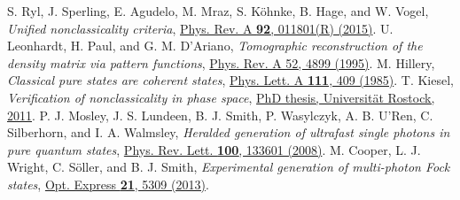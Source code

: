 \documentclass[aps,pra,twocolumn,showpacs,superscriptaddress,10pt]{revtex4-1}
\begin{document}
\begin{thebibliography}{100}
	 S. Ryl, J. Sperling, E. Agudelo, M. Mraz, S. K\"ohnke, B. Hage, and W. Vogel, {\it Unified nonclassicality criteria}, \href{http://link.aps.org/doi/10.1103/PhysRevA.92.011801}{Phys. Rev. A {\bf 92}, 011801(R) (2015)}.
	 U. Leonhardt, H. Paul, and G. M. D’Ariano, {\it Tomographic reconstruction of the density matrix via pattern functions}, \href{http://link.aps.org/doi/10.1103/PhysRevA.52.4899}{Phys. Rev. A 52, 4899 (1995)}.
	 M. Hillery, {\it Classical pure states are coherent states}, \href{http://www.sciencedirect.com/science/article/pii/0375960185904839}{Phys. Lett. A {\bf 111}, 409 (1985)}.
%
	 T. Kiesel, {\it Verification of nonclassicality in phase space}, \href{http://rosdok.uni-rostock.de/resolve?urn=urn:nbn:de:gbv:28-diss2011-0145-7&pdf}{PhD thesis, Universit\"at Rostock, 2011}.
	 P. J. Mosley, J. S. Lundeen, B. J. Smith, P. Wasylczyk, A. B. U'Ren, C. Silberhorn, and I. A. Walmsley, {\it Heralded generation of ultrafast single photons in pure quantum states}, \href{http://link.aps.org/doi/10.1103/PhysRevLett.100.133601}{Phys. Rev. Lett. {\bf 100}, 133601 (2008)}.
	 M. Cooper, L. J. Wright, C. S\"{o}ller, and B. J. Smith, {\it Experimental generation of multi-photon Fock states}, \href{http://www.opticsexpress.org/abstract.cfm?URI=oe-21-5-5309}{Opt. Express {\bf 21}, 5309 (2013)}.
\end{thebibliography}
\end{document}
